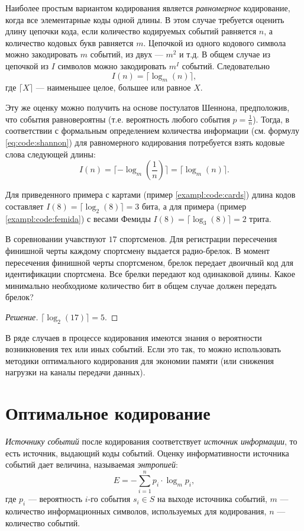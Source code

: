 Наиболее простым вариантом кодирования является \emph{равномерное} кодирование, когда все элементарные коды одной длины. В этом случае требуется оценить длину цепочки кода, если количество кодируемых событий равняется $n$, а количество кодовых букв равняется $m$. Цепочкой из одного кодового символа можно закодировать $m$ событий, из двух --- $m^2$ и т.д. В общем случае из цепочкой из $I$ символов можно закодировать $m^I$ событий. Следовательно
\[
    I(n)=\lceil\log_m(n)\rceil,
\]
где $\lceil X \rceil$ --- наименьшее целое, большее или равное $X$.

Эту же оценку можно получить на основе постулатов Шеннона, предположив, что события равновероятны (т.е. вероятность любого события $p=\frac{1}{n}$). Тогда, в соответствии с формальным определением количества информации (см. формулу \eqref{eq:code:shannon}) для равномерного кодирования потребуется взять кодовые слова следующей длины:
\[
    I(n)=\lceil -\log_m\left(\frac{1}{n}\right)\rceil=\lceil \log_m(n) \rceil.
\]

Для приведенного примера с картами (пример \ref{exampl:code:cards}) длина кодов составляет $I(8)=\lceil \log_2(8) \rceil=3$ бита, а для примера (пример \ref{exampl:code:femida}) с весами Фемиды $I(8)=\lceil \log_3(8) \rceil=2$ трита.

\begin{exampl}
    В соревновании учавствуют $17$ спортсменов. Для регистрации пересечения финишной черты каждому спортсмену выдается радио-брелок. В момент пересечения финишной черты спортсменом, брелок передает двоичный код для идентификации спортсмена. Все брелки передают код одинаковой длины. Какое минимально необходиоме количество бит в общем случае должен передать брелок?
\end{exampl}
\begin{proof}[Решение] $\lceil \log_2(17)\rceil = 5$.
\end{proof}

В ряде случаев в процессе кодирования имеются знания о вероятности возникновения тех или иных событий. Если это так, то можно использовать методики оптимального кодирования для экономии памяти (или снижения нагрузки на каналы передачи данных).


\section{Оптимальное кодирование}

\emph{Источнику событий} после кодирования соответствует \emph{источник информации}, то есть источник, выдающий коды событий. Оценку информативности источника событий дает величина, называемая \emph{энтропией}:
\begin{equation}
    \label{eq:code:entrophyS}
    E=-\sum_{i=1}^n {p_i\cdot\log_m p_i},
\end{equation}
где $p_i$ --- вероятность $i$-го события $s_i\in S$ на выходе источника событий, $m$ --- количество информационных символов, используемых для кодирования, $n$ --- количество событий.

